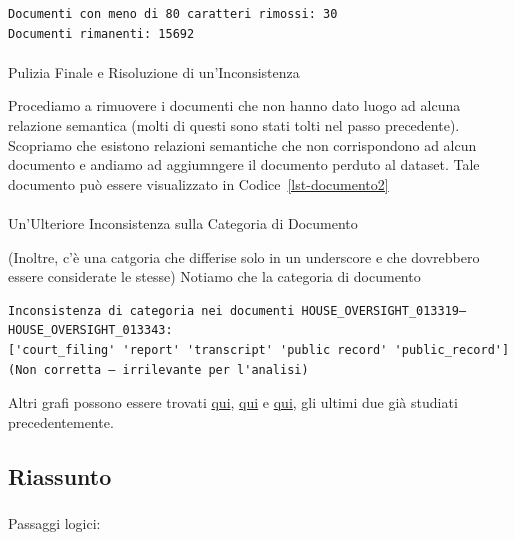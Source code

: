 \documentclass[
  italian,
  a4paper,
]{article}
\makeatletter
\let\oldparagraph\paragraph
\renewcommand{\paragraph}{
    \@ifstar
      \xxxParagraphStar
      \xxxParagraphNoStar
  }
\newcommand{\xxxParagraphStar}[1]{\oldparagraph*{#1}\mbox{}}
\newcommand{\xxxParagraphNoStar}[1]{\oldparagraph{#1}\mbox{}}
\let\oldsubparagraph\subparagraph
\renewcommand{\subparagraph}{
    \@ifstar
      \xxxSubParagraphStar
      \xxxSubParagraphNoStar
  }
\newcommand{\xxxSubParagraphStar}[1]{\oldsubparagraph*{#1}\mbox{}}
\newcommand{\xxxSubParagraphNoStar}[1]{\oldsubparagraph{#1}\mbox{}}
\makeatother
\begin{document}
\begin{verbatim}
Documenti con meno di 80 caratteri rimossi: 30
Documenti rimanenti: 15692
\end{verbatim}

\paragraph{Pulizia Finale e Risoluzione di
un'Inconsistenza}\label{pulizia-finale-e-risoluzione-di-uninconsistenza}

Procediamo a rimuovere i documenti che non hanno dato luogo ad alcuna
relazione semantica (molti di questi sono stati tolti nel passo
precedente). Scopriamo che esistono relazioni semantiche che non
corrispondono ad alcun documento e andiamo ad aggiumngere il documento
perduto al dataset. Tale documento può essere visualizzato in
Codice~\ref{lst-documento2}

\paragraph{Un'Ulteriore Inconsistenza sulla Categoria di
Documento}\label{unulteriore-inconsistenza-sulla-categoria-di-documento}

(Inoltre, c'è una catgoria che differise solo in un underscore e che
dovrebbero essere considerate le stesse) Notiamo che la categoria di
documento

\begin{verbatim}
Inconsistenza di categoria nei documenti HOUSE_OVERSIGHT_013319–HOUSE_OVERSIGHT_013343:
['court_filing' 'report' 'transcript' 'public record' 'public_record']
(Non corretta — irrilevante per l'analisi)
\end{verbatim}

Altri grafi possono essere trovati
\href{https://epstein-file-explorer.com/network}{qui},
\href{https://epsteingraph.com/}{qui} e \href{}{qui}, gli ultimi due già
studiati precedentemente.

\subsection{Riassunto}\label{riassunto}

\subparagraph{Passaggi logici:}\label{passaggi-logici}
\end{document}
